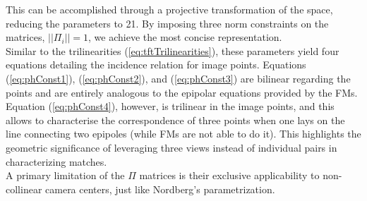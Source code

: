 This can be accomplished through a projective transformation of the space, reducing the parameters to 21. By imposing three norm constraints on the matrices, \( || \Pi_i || = 1 \), we achieve the most concise representation.\\

Similar to the trilinearities (\ref{eq:tftTrilinearities}), these parameters yield four equations detailing the incidence relation for image points. Equations (\ref{eq:phConst1}), (\ref{eq:phConst2}), and (\ref{eq:phConst3}) are bilinear regarding the points and are entirely analogous to the epipolar equations provided by the \acs{FM}s. Equation (\ref{eq:phConst4}), however, is trilinear in the image points, and this allows to characterise the correspondence of three points when one lays on the line connecting two epipoles (while \acs{FM}s are not able to do it). This highlights the geometric significance of leveraging three views instead of individual pairs in characterizing matches.\\

A primary limitation of the \( \Pi \) matrices is their exclusive applicability to non-collinear camera centers, just like Nordberg's parametrization.
